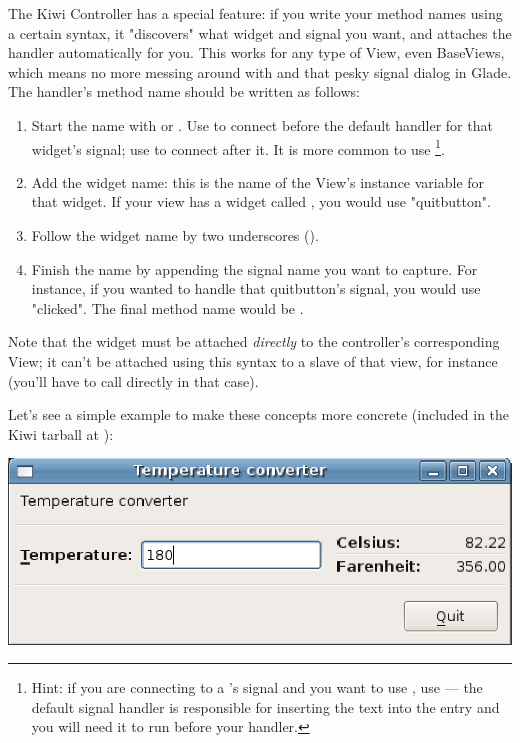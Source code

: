 \documentclass[a4paper]{howto}
\begin{document}
The Kiwi Controller has a special feature: if you write your method
names using a certain syntax, it "discovers" what widget and signal you
want, and attaches the handler automatically for you. This works for any
type of View, even BaseViews, which means no more messing around with
 and that pesky signal dialog in Glade. The
handler's method name should be written as follows:

\begin{enumerate}
\item Start the name with  or . Use  to
connect before the default handler for that widget's signal; use
 to connect after it. It is more common to use
\footnote{Hint: if you are connecting
to a 's  signal and you want to use
, use 
--- the default signal handler is responsible for inserting the text
into the entry and you will need it to run before your handler.}.

\item Add the widget name: this is the name of the View's instance
variable for that widget.  If your view has a widget called
, you would use "quitbutton".

\item Follow the widget name by two underscores (\code{\_\_}).

\item Finish the name by appending the signal name you want to capture.
For instance, if you wanted to handle that quitbutton's 
signal, you would use "clicked". The final method name would be
.
\end{enumerate}

Note that the widget must be attached {\it directly} to the controller's
corresponding View; it can't be attached using this syntax to a slave of
that view, for instance (you'll have to call  directly
in that case).

Let's see a simple example to make
these concepts more concrete (included in the Kiwi tarball at
):

\begin{center}
\includegraphics[scale=0.905]{images/faren.eps}
\end{center}
\end{document}
